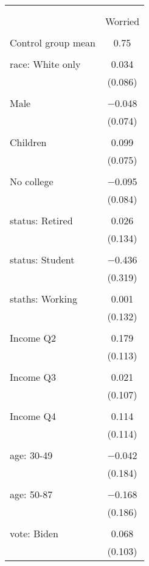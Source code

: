 
\begin{tabular}{@{\extracolsep{5pt}}lc} 
\\[-1.8ex]\hline 
\hline \\[-1.8ex] 
\\[-1.8ex] & Worried \\ 
\hline \\[-1.8ex] 
 Control group mean & 0.75  \\ \hline \\[-1.8ex] race: White only & 0.034 \\ 
  & (0.086) \\ 
  & \\ 
 Male & $-$0.048 \\ 
  & (0.074) \\ 
  & \\ 
 Children & 0.099 \\ 
  & (0.075) \\ 
  & \\ 
 No college & $-$0.095 \\ 
  & (0.084) \\ 
  & \\ 
 status: Retired & 0.026 \\ 
  & (0.134) \\ 
  & \\ 
 status: Student & $-$0.436 \\ 
  & (0.319) \\ 
  & \\ 
 staths: Working & 0.001 \\ 
  & (0.132) \\ 
  & \\ 
 Income Q2 & 0.179 \\ 
  & (0.113) \\ 
  & \\ 
 Income Q3 & 0.021 \\ 
  & (0.107) \\ 
  & \\ 
 Income Q4 & 0.114 \\ 
  & (0.114) \\ 
  & \\ 
 age: 30-49 & $-$0.042 \\ 
  & (0.184) \\ 
  & \\ 
 age: 50-87 & $-$0.168 \\ 
  & (0.186) \\ 
  & \\ 
 vote: Biden & 0.068 \\ 
  & (0.103) \\ 

\end{tabular}

